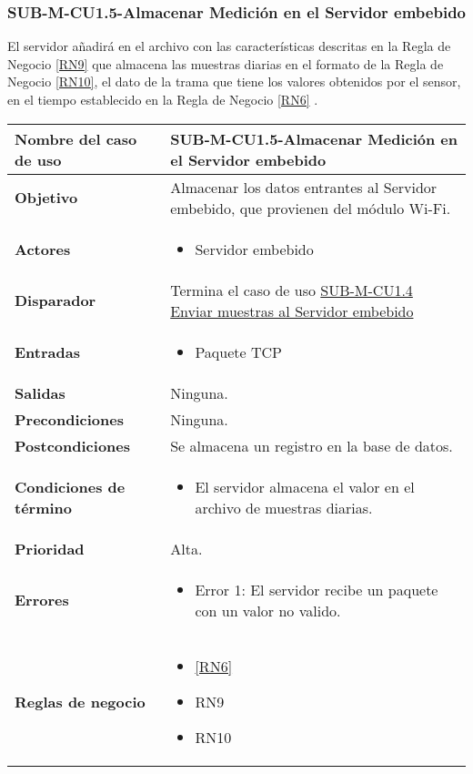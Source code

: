 \subsubsection{SUB-M-CU1.5-Almacenar Medición en el Servidor embebido}\label{SUB-M-CU1.5}
El servidor añadirá en el archivo con las características descritas en la Regla de Negocio \ref{RN9} que almacena las muestras diarias en el formato de la Regla de Negocio \ref{RN10}, el dato de la trama que tiene los valores obtenidos por el sensor, en el tiempo establecido en la Regla de Negocio \ref{RN6} .
\begin{longtable}{|J{5cm}|J{10.3cm}|}
	\hline
	\textbf{Nombre del caso de uso} &
		SUB-M-CU1.5-Almacenar Medición en el Servidor embebido\\ \hline
	\textbf{Objetivo} &
		Almacenar los datos entrantes al Servidor embebido, que provienen del módulo Wi-Fi. \\ \hline
	\textbf{Actores} &
		\begin{itemize}
			\item Servidor embebido
		\end{itemize} \\ \hline
	\textbf{Disparador} & 
	    Termina el caso de uso \hyperref[SUB-M-CU1.4]{SUB-M-CU1.4 Enviar muestras al Servidor embebido} \\ \hline 
	\textbf{Entradas} & 
		\begin{itemize}
				\item Paquete TCP
		\end{itemize}\\ \hline 
	\textbf{Salidas} & 
        Ninguna. \\ \hline
	\textbf{Precondiciones} &
	    Ninguna. \\ \hline
	\textbf{Postcondiciones} &
		Se almacena un registro en la base de datos.\\ \hline
	\textbf{Condiciones de término} & 
		\begin{itemize}
			\item El servidor almacena el valor en el archivo de muestras diarias.
		\end{itemize} \\ \hline 
	\textbf{Prioridad} & 
		Alta. \\ \hline
	\textbf{Errores} & 
		\begin{itemize}
		    \item \label{CU11:Error1} Error 1: El servidor recibe un paquete con un valor no valido.
		\end{itemize} \\ \hline
	\textbf{Reglas de negocio} & 
		\begin{itemize}
            \item \ref{RN6}
            \item RN9
            \item RN10
		\end{itemize} \\ \hline

\end{longtable}

